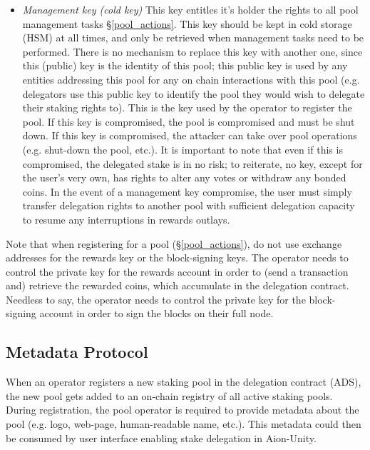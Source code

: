 \begin{itemize}
    \item \textit{Management key (cold key)} This key entitles it's holder the rights to all pool management tasks \S\ref{pool_actions}. This key should be kept in cold storage (HSM) at all times, and only be retrieved when management tasks need to be performed. There is no mechanism to replace this key with another one, since this (public) key is the identity of this pool; this public key is used by any entities addressing this pool for any on chain interactions with this pool (e.g. delegators use this public key to identify the pool they would wish to delegate their staking rights to). This is the key used by the operator to register the pool. If this key is compromised, the pool is compromised and must be shut down. If this key is compromised, the attacker can take over pool operations (e.g. shut-down the pool, etc.). It is important to note that even if this  is compromised, the delegated stake is in no risk; to reiterate, no key, except for the user's very own, has rights to alter any votes or withdraw any bonded coins. In the event of a management key compromise, the user must simply transfer delegation rights to another pool with sufficient delegation capacity to resume any interruptions in rewards outlays. 
\end{itemize}

Note that when registering for a pool (\S\ref{pool_actions}), do not use exchange addresses for the rewards key or the block-signing keys. The operator needs to control the private key for the rewards account in order to (send a transaction and) retrieve the rewarded coins, which accumulate in the delegation contract. Needless to say, the operator needs to control the private key for the block-signing account in order to sign the blocks on their full node.   

\subsection{Metadata Protocol} \label{metadata_protocol}
When an operator registers a new staking pool in the delegation contract (ADS), the new pool gets added to an on-chain registry of all active staking pools. During registration, the pool operator is required to provide metadata about the pool (e.g. logo, web-page, human-readable name, etc.). This metadata could then be consumed by user interface enabling stake delegation in Aion-Unity. 

